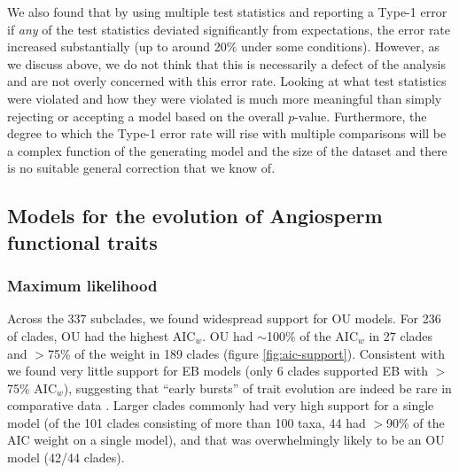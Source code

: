 We also found that by using multiple test statistics and reporting a Type-1 error if \emph{any} of the test statistics deviated significantly from expectations, the error rate increased substantially (up to around 20\% under some conditions). However, as we discuss above, we do not think that this is necessarily a defect of the analysis and are not overly concerned with this error rate. Looking at what test statistics were violated and how they were violated is much more meaningful than simply rejecting or accepting a model based on the overall $p$-value. Furthermore, the degree to which the Type-1 error rate will rise with multiple comparisons will be a complex function of the generating model and the size of the dataset and there is no suitable general correction that we know of.

\subsection{Models for the evolution of Angiosperm functional traits}

\subsubsection{Maximum likelihood}

Across the 337 subclades, we found widespread support for OU
models. For 236 of clades, OU had the highest AIC$_w$.
OU had $\sim$100\% of the AIC$_w$ in 27 clades and $>$75\% of the weight in 189 clades (figure \ref{fig:aic-support}). Consistent with \citet{Harmon2010} we found very little support for EB models (only 6 clades supported EB with $>$75\% AIC$_w$), suggesting that ``early bursts'' of trait evolution are indeed be rare in comparative data \citep[but see][]{SlaterPennell}. Larger clades commonly had
very high support for a single model (of the 101 clades consisting of more than 100 taxa, 44 had $>$90\% of the AIC weight on a single model),
and that was overwhelmingly likely to be an OU model (42/44 clades).

